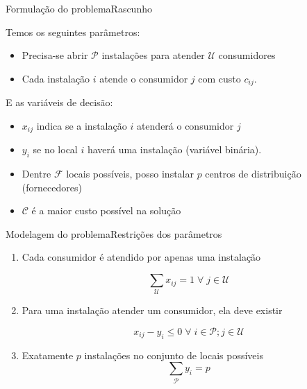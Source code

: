 \documentclass{beamer}
\newenvironment{outeritemize}{\begin{itemize}}{\end{itemize}\vspace{12pt}}
\begin{document}

\begin{frame}{Formulação do problema}{Rascunho}

Temos os seguintes parâmetros:
\begin{outeritemize}
    \item Precisa-se abrir $\mathcal{P}$ instalações para atender $\mathcal{U}$ consumidores
    \item Cada instalação $i$ atende o consumidor $j$ com custo $c_{ij}$.
\end{outeritemize}

E as variáveis de decisão:
\begin{outeritemize}
    \item $x_{ij}$ indica se a instalação $i$ atenderá o consumidor $j$
    \item $y_{i}$ se no local $i$ haverá uma instalação (variável binária).
    \item Dentre $\mathcal{F}$ locais possíveis, posso instalar $p$ centros de distribuição (fornecedores)
    \item $\mathcal{C}$ é a maior custo possível na solução
\end{outeritemize}

\end{frame}

\begin{frame}{Modelagem do problema}{Restrições dos parâmetros}
    
    \begin{enumerate}
        \item Cada consumidor é atendido por apenas uma instalação 
        
        \begin{equation*}
            \sum_{\mathcal{U}} x_{ij} = 1 \;\forall\;j \in\mathcal{U}
        \end{equation*} 
    
        \item Para uma instalação atender um consumidor, ela deve existir

        \begin{equation*}
            x_{ij} - y_i \leq 0 \;\forall\;i \in\mathcal{P} ;j \in \mathcal{U}
        \end{equation*}

        \item Exatamente $p$ instalações no conjunto de locais possíveis
        \begin{equation*}
            \sum_{\mathcal{P}} y_{i} = p 
        \end{equation*} 

    \end{enumerate}
      
\end{frame}
\end{document}
